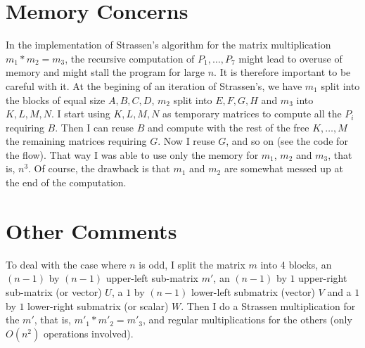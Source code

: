 \documentclass{article}
\begin{document}
\section{Memory Concerns}
In the implementation of Strassen's algorithm for the matrix multiplication $ m_1 * m_2 = m_3 $, the recursive computation of $ P_1, \ldots, P_7 $ might lead to overuse of memory and might stall the program for large $ n $.
It is therefore important to be careful with it.
At the begining of an iteration of Strassen's, we have $ m_1 $ split into the blocks of equal size $ A, B, C, D $, $ m_2 $ split into $ E, F, G, H $ and $ m_3 $ into $ K, L, M, N $.
I start using $ K, L, M, N $ as temporary matrices to compute all the $ P_i $ requiring $ B $.  
Then I can reuse $ B $ and compute with the rest of the free $ K, \ldots, M $ the remaining matrices requiring $ G $.
Now I reuse $ G $, and so on (see the code for the flow).
That way I was able to use only the memory for $ m_1 $, $ m_2 $ and $ m_3 $, that is, $ n^3 $.
Of course, the drawback is that $ m_1 $ and $ m_2 $ are somewhat messed up at the end of the computation.

\section{Other Comments}
To deal with the case where $ n $ is odd, I split the matrix $ m $ into 4 blocks, an $ (n-1) $ by $ (n-1) $ upper-left sub-matrix $ m' $, an $ (n-1) $ by $ 1 $ upper-right sub-matrix (or vector) $ U $, a $ 1 $ by $ (n-1) $ lower-left submatrix (vector) $ V $ and a $ 1 $ by $ 1 $ lower-right submatrix (or scalar) $ W $.
Then I do a Strassen multiplication for the $ m' $, that is, $ m'_1 * m'_2 = m'_3 $, and regular multiplications for the others (only $ O(n^2) $ operations involved).
\end{document}
